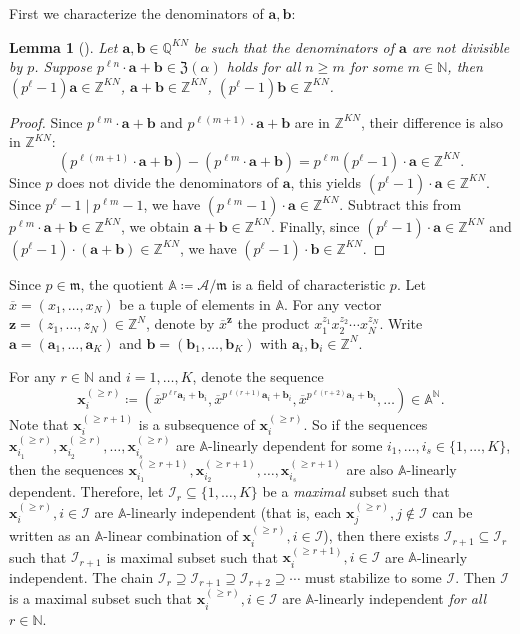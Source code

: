 \documentclass[letterpaper, 11pt, thm-restate]{article}
\numberwithin{equation}{section}
\newcommand{\Z}{\mathbb{Z}}
\newcommand{\N}{\mathbb{N}}
\newcommand{\Q}{\mathbb{Q}}
\newcommand{\A}{\mathbb{A}}
\newcommand{\mI}{\mathcal{I}}
\newcommand{\mA}{\mathcal{A}}
\newcommand{\mZ}{\mathfrak{Z}}
\newcommand{\ba}{\boldsymbol{a}}
\newcommand{\bb}{\boldsymbol{b}}
\newcommand{\bx}{\boldsymbol{x}}
\newcommand{\bz}{\boldsymbol{z}}
\newcommand{\ox}{\overline{x}}
\newcommand{\frm}{\mathfrak{m}}
\newtheorem{lem}[thrm]{Lemma}
\theoremstyle{definition}
\theoremstyle{definition}
\theoremstyle{definition}
\begin{document}
First we characterize the denominators of $\ba, \bb$:

\begin{lem}[{\cite[p.117]{derksen2015linear}}]\label{lem:denom}
    Let $\ba, \bb \in \Q^{KN}$ be such that the denominators of $\ba$ are not divisible by $p$.
    Suppose $p^{\ell n} \cdot \ba + \bb \in \mZ(\alpha)$ holds for all $n \geq m$ for some $m \in \N$, then $(p^{\ell} - 1) \ba \in \Z^{KN}$, $\ba + \bb \in \Z^{KN}$, $(p^{\ell} - 1) \bb \in \Z^{KN}$.
\end{lem}
\begin{proof}
    Since $p^{\ell m} \cdot \ba + \bb$ and $p^{\ell (m+1)} \cdot \ba + \bb$ are in $\Z^{KN}$, their difference is also in $\Z^{KN}$:
    \[
    (p^{\ell (m+1)} \cdot \ba + \bb) - (p^{\ell m} \cdot \ba + \bb) = p^{\ell m} (p^{\ell} - 1) \cdot \ba \in \Z^{KN}.
    \]
    Since $p$ does not divide the denominators of $\ba$, this yields $(p^{\ell} - 1) \cdot \ba \in \Z^{KN}$.
    Since $p^{\ell} - 1 \mid p^{\ell m} - 1$, we have $(p^{\ell m} - 1) \cdot \ba \in \Z^{KN}$.
    Subtract this from $p^{\ell m} \cdot \ba + \bb \in \Z^{KN}$, we obtain $\ba + \bb \in \Z^{KN}$.
    Finally, since $(p^{\ell} - 1) \cdot \ba \in \Z^{KN}$ and $(p^{\ell} - 1) \cdot (\ba + \bb) \in \Z^{KN}$, we have $(p^{\ell} - 1) \cdot \bb \in \Z^{KN}$.
\end{proof}

Since $p \in \frm$, the quotient $\A \coloneqq \mA/\frm$ is a field of characteristic $p$.
Let $\ox = (x_1, \ldots, x_N)$ be a tuple of elements in $\A$.
For any vector $\bz = (z_1, \ldots, z_N) \in \Z^N$, denote by $\ox^{\bz}$ the product $x_1^{z_1} x_2 ^{z_2} \cdots x_N^{z_N}$.
Write $\ba = (\ba_1, \ldots, \ba_K)$ and $\bb = (\bb_1, \ldots, \bb_K)$ with $\ba_i, \bb_i \in \Z^N$.

For any $r \in \N$ and $i = 1, \ldots, K$, denote the sequence
\begin{equation}\label{eq:defbxgeq}
\bx_i^{(\geq r)} \coloneqq (\ox^{p^{\ell r} \ba_i + \bb_i}, \ox^{p^{\ell (r+1)} \ba_i + \bb_i}, \ox^{p^{\ell (r+2)} \ba_i + \bb_i}, \ldots) \in \A^{\N}.
\end{equation}
Note that $\bx_i^{(\geq r+1)}$ is a subsequence of $\bx_i^{(\geq r)}$.
So if the sequences $\bx_{i_1}^{(\geq r)}, \bx_{i_2}^{(\geq r)}, \ldots, \bx_{i_s}^{(\geq r)}$ are $\A$-linearly dependent for some $i_1, \ldots, i_s \in \{1, \ldots, K\}$, then the sequences $\bx_{i_1}^{(\geq r+1)}, \bx_{i_2}^{(\geq r+1)}, \ldots, \bx_{i_s}^{(\geq r+1)}$ are also $\A$-linearly dependent.
Therefore, let $\mI_r \subseteq \{1, \ldots, K\}$ be a \emph{maximal} subset such that $\bx_i^{(\geq r)}, i \in \mI$ are $\A$-linearly independent (that is, each $\bx_j^{(\geq r)}, j \notin \mI$ can be written as an $\A$-linear combination of $\bx_i^{(\geq r)}, i \in \mI$), then there exists $\mI_{r+1} \subseteq \mI_r$ such that $\mI_{r+1}$ is maximal subset such that $\bx_i^{(\geq r+1)}, i \in \mI$ are $\A$-linearly independent.
The chain $\mI_r \supseteq \mI_{r+1} \supseteq \mI_{r+2} \supseteq \cdots$ must stabilize to some $\mI$.
Then $\mI$ is a maximal subset such that $\bx_i^{(\geq r)}, i \in \mI$ are $\A$-linearly independent \emph{for all $r \in \N$}.
\end{document}
